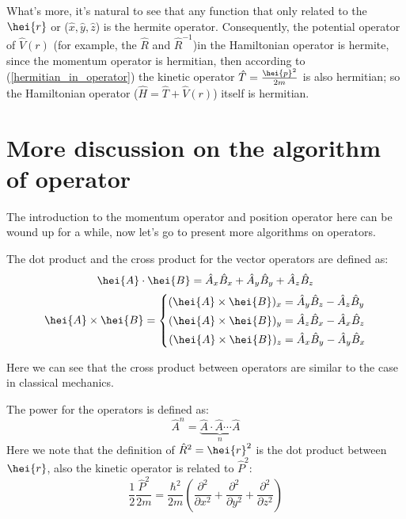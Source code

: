 What's more, it's natural to see that any function that only related
to the $\hei{r}$ or ($\hat{x}, \hat{y}, \hat{z}$) is the hermite
operator. Consequently, the potential operator of $\hat{V}(r)$ (for
example, the $\hat{R}$ and $\hat{R}^{-1}$)in the Hamiltonian
operator is hermite, since the momentum operator is hermitian, then
according to (\ref{hermitian_in_operator}) the kinetic operator
$\hat{T} = \frac{\hei{p}^{2}}{2m}$ is also hermitian; so the
Hamiltonian operator ($\hat{H} = \hat{T} + \hat{V}(r)$) itself is
hermitian.

\section{More discussion on the algorithm of operator}
%
%
%
%
The introduction to the momentum operator and position operator here
can be wound up for a while, now let's go to present more algorithms
on operators.

The dot product and the cross product for the vector operators are
defined as:
\begin{equation}\label{OPERATORMOREeq:2}
\hei{A}\cdot\hei{B} = \hat{A}_{x}\hat{B}_{x} +
\hat{A}_{y}\hat{B}_{y} + \hat{A}_{z}\hat{B}_{z}
\end{equation}
\begin{equation} \label{OPERATORMOREeq:3}
\hei{A}\times\hei{B} = \left\{ \begin{aligned}
         (\hei{A}\times\hei{B})_{x} &= \hat{A}_{y}\hat{B}_{z} -  \hat{A}_{z}\hat{B}_{y} \nonumber \\
         (\hei{A}\times\hei{B})_{y} &= \hat{A}_{z}\hat{B}_{x} -  \hat{A}_{x}\hat{B}_{z} \nonumber \\
         (\hei{A}\times\hei{B})_{z} &= \hat{A}_{x}\hat{B}_{y} -  \hat{A}_{y}\hat{B}_{x}
                          \end{aligned} \right.
\end{equation}

Here we can see that the cross product between operators are similar
to the case in classical mechanics.

The power for the operators is defined as:
\begin{equation}\label{}
\hat{A}^{n} = \underbrace{\hat{A}\cdot\hat{A}\cdots\hat{A}}_{n}
\end{equation}
Here we note that the definition of $\hat{R}^{2} = \hei{r}^{2}$ is
the dot product between $\hei{r}$, also the kinetic operator is
related to $\hat{P}^{2}$:
\begin{equation}\label{}
\frac{1}{2}\frac{\hat{P}^{2}}{2m} = \frac{\hbar^{2}}{2m}\left(
\frac{\partial^{2}}{\partial x^{2}} + \frac{\partial^{2}}{\partial
y^{2}} + \frac{\partial^{2}}{\partial z^{2}}  \right)
\end{equation}

